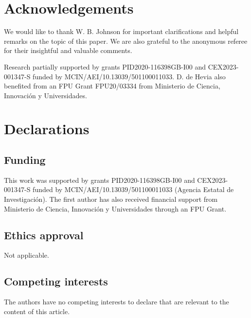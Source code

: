 \documentclass[11pt]{amsart}
\theoremstyle{definition}
\numberwithin{equation}{section}
\begin{document}
\section*{Acknowledgements}
We would like to thank W. B. Johnson for important clarifications and helpful remarks on the topic of this paper. We are also grateful to the anonymous referee for their insightful and valuable comments.


Research partially supported by grants PID2020-116398GB-I00 and CEX2023-001347-S funded by  MCIN/AEI/10.13039/501100011033. D. de Hevia also benefited from an FPU Grant FPU20/03334 from Ministerio de Ciencia, Innovación y Universidades. 

\section*{Declarations}

\subsection*{Funding} This work was supported by grants PID2020-116398GB-I00 and CEX2023-001347-S funded by  MCIN/AEI/10.13039/501100011033 (Agencia Estatal de Investigación). The first author has also received financial support from Ministerio de Ciencia, Innovación y Universidades through an FPU Grant.

\subsection*{Ethics approval} 

Not applicable.

\subsection*{Competing interests}

The authors have no competing interests to declare that are relevant to the content of this article.
\end{document}
